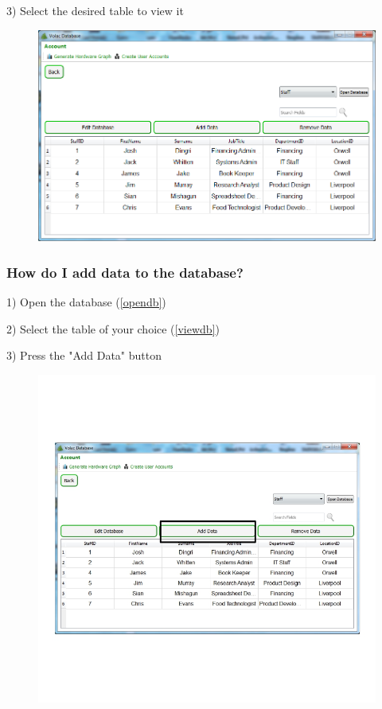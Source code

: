 3) Select the desired table to view it

\begin{figure}[H]
    \includegraphics[width=\textwidth]{./Manual/Images/tabl2.png}
\end{figure}

\subsubsection{How do I add data to the database?}\label{adddata}

1) Open the database (\ref{opendb})

2) Select the table of your choice (\ref{viewdb})

3) Press the "Add Data" button

\begin{figure}[H]
    \includegraphics[width=\textwidth]{./Manual/Images/adddata.jpg}
\end{figure}

